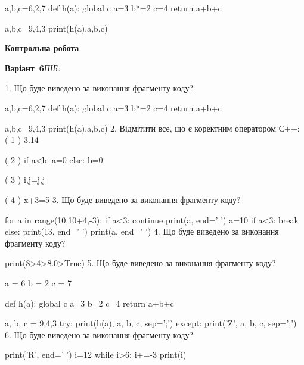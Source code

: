 \documentclass[11pt]{article}
\begin{document}
a,b,c=6,2,7
def h(a):
global c    a=3
    b*=2
    c=4
    return a+b+c

a,b,c=9,4,3
print(h(a),a,b,c)
\vspace{5mm}










\newpage

\newpage

{\large\textbf{Контрольна робота}}

\textbf{Варіант \No\,6}\hfill \textit{ПІБ:}\,\underline{\hspace{60mm}}
\vspace{4mm}

1. Що буде виведено за виконання фрагменту коду?

a,b,c=6,2,7
def h(a):
global c    a=3
    b*=2
    c=4
    return a+b+c

a,b,c=9,4,3
print(h(a),a,b,c)
\vspace{5mm}
2. %
Відмітити все, що є коректним оператором С++:
( 1 ) 3.14%

( 2 ) if a<b: a=0 else: b=0

( 3 ) i,j=j,j

( 4 ) x+3=5
\vspace{5mm}
3. Що буде виведено за виконання фрагменту коду?

for a in range(10,10+4,-3):
    if a<3:
        continue
    print(a, end=' ')
    a=10
    if a<3:
        break
else:
    print(13, end=' ')
print(a, end=' ')
\vspace{5mm}
4. Що буде виведено за виконання фрагменту коду?

print(8>4>8.0>True)
\vspace{5mm}
5. Що буде виведено за виконання фрагменту коду?

a = 6
b = 2
c = 7

def h(a):
global c    a=3
    b=2
    c=4
    return a+b+c

a, b, c = 9,4,3
try:
    print(h(a), a, b, c, sep=';')
except:
    print('Z', a, b, c, sep=';')
\vspace{5mm}
6. Що буде виведено за виконання фрагменту коду?

print('R', end=' ')
i=12
while i>6:
    i+=-3
print(i)
\end{document}
